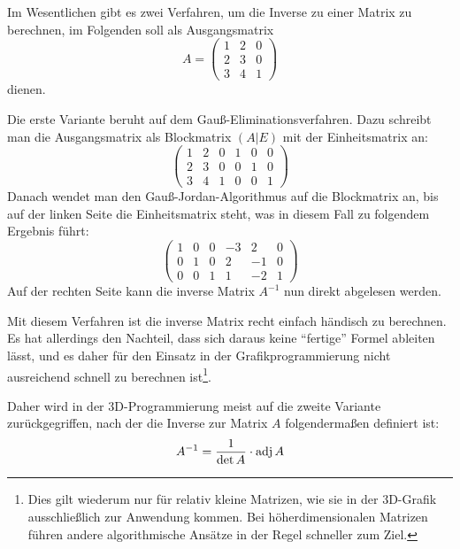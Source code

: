 Im Wesentlichen gibt es zwei Verfahren, um die Inverse zu einer Matrix zu berechnen, im Folgenden soll als Ausgangsmatrix
\begin{equation*}
 A = \begin{pmatrix}
  1 & 2 & 0 \\
  2 & 3 & 0 \\
  3 & 4 & 1
 \end{pmatrix}
\end{equation*}
dienen.

Die erste Variante beruht auf dem Gauß-Eliminationsverfahren. Dazu schreibt man die Ausgangsmatrix als Blockmatrix $(A|E)$ mit der Einheitsmatrix an:
\begin{equation}
 \left(\begin{array}{ccc|ccc}
    1 & 2 & 0 &  1 & 0 & 0 \\
    2 & 3 & 0 &  0 & 1 & 0 \\
    3 & 4 & 1 &  0 & 0 & 1
  \end{array}\right)
\end{equation}
Danach wendet man den Gauß-Jordan-Algorithmus auf die Blockmatrix an, bis auf der linken Seite die Einheitsmatrix steht, was in diesem Fall zu folgendem Ergebnis führt:
\begin{equation}
  \left(\begin{array}{ccc|ccc}
    1 & 0 & 0  & -3 & 2 & 0 \\
    0 & 1 & 0  & 2 & -1 & 0 \\
    0 & 0 & 1  & 1 & -2 & 1
  \end{array}\right)
\end{equation}
Auf der rechten Seite kann die inverse Matrix $A^{-1}$ nun direkt abgelesen werden.

Mit diesem Verfahren ist die inverse Matrix recht einfach händisch zu berechnen. Es hat allerdings den Nachteil, dass sich daraus keine \enquote{fertige} Formel ableiten lässt, und es daher für den Einsatz in der Grafikprogrammierung nicht ausreichend schnell zu berechnen ist\footnote{Dies gilt wiederum nur für relativ kleine Matrizen, wie sie in der 3D-Grafik ausschließlich zur Anwendung kommen. Bei höherdimensionalen Matrizen führen andere algorithmische Ansätze in der Regel schneller zum Ziel.}.

Daher wird in der 3D-Programmierung meist auf die zweite Variante zurückgegriffen, nach der die Inverse zur Matrix $A$ folgendermaßen definiert ist:
\begin{equation}
 A^{-1} = \frac{1}{\det A} \cdot \operatorname{adj}A
\end{equation}

